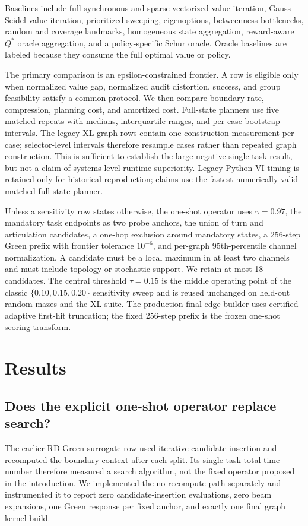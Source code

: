 \documentclass[10pt]{article}
\begin{document}
Baselines include full synchronous and sparse-vectorized value iteration,
Gauss-Seidel value iteration, prioritized sweeping\citep{moore1993prioritized},
eigenoptions, betweenness bottlenecks, random and coverage landmarks,
homogeneous state aggregation, reward-aware $Q^*$ oracle aggregation, and a
policy-specific Schur oracle. Oracle baselines are labeled because they consume
the full optimal value or policy.

The primary comparison is an epsilon-constrained frontier. A row is eligible
only when normalized value gap, normalized audit distortion, success, and group
feasibility satisfy a common protocol. We then compare boundary rate,
compression, planning cost, and amortized cost. Full-state planners use five
matched repeats with medians, interquartile ranges, and per-case bootstrap
intervals. The legacy XL graph rows contain one construction measurement per
case; selector-level intervals therefore resample cases rather than repeated
graph construction. This is sufficient to establish the large negative
single-task result, but not a claim of systems-level runtime superiority.
Legacy Python VI timing is retained only for historical reproduction; claims
use the fastest numerically valid matched full-state planner.

Unless a sensitivity row states otherwise, the one-shot operator uses
$\gamma=0.97$, the mandatory task endpoints as two probe anchors, the union of
turn and articulation candidates, a one-hop exclusion around mandatory states,
a 256-step Green prefix with frontier tolerance $10^{-6}$, and per-graph
95th-percentile channel normalization. A candidate must be a local maximum in
at least two channels and must include topology or stochastic support. We retain
at most 18 candidates. The central threshold $\tau=0.15$ is the middle operating
point of the classic $\{0.10,0.15,0.20\}$ sensitivity sweep and is reused
unchanged on held-out random mazes and the XL suite. The production final-edge
builder uses certified adaptive first-hit truncation; the fixed 256-step prefix
is the frozen one-shot scoring transform.

\section{Results}
\subsection{Does the explicit one-shot operator replace search?}
The earlier RD Green surrogate row used iterative candidate insertion and
recomputed the boundary context after each split. Its single-task total-time
number therefore measured a search algorithm, not the fixed operator proposed
in the introduction. We implemented the no-recompute path separately and
instrumented it to report zero candidate-insertion evaluations, zero beam
expansions, one Green response per fixed anchor, and exactly one final graph
kernel build.
\end{document}
